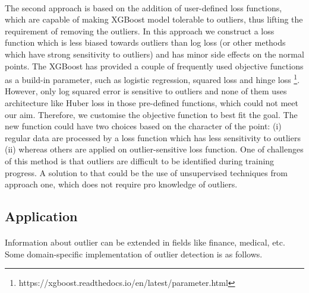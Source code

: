 \documentclass[runningheads]{llncs}
\begin{document}
\paragraph{} The second approach is based on the addition of user-defined loss functions, which are capable of making XGBoost model tolerable to outliers, thus lifting the requirement of removing the outliers. In this approach we construct a loss function which is less biased towards outliers than log loss (or other methods which have strong sensitivity to outliers) and has minor side effects on the normal points. The XGBoost has provided a couple of frequently used objective functions as a build-in parameter, such as logistic regression, squared loss and hinge loss \footnote{https://xgboost.readthedocs.io/en/latest/parameter.html}. However, only log squared error is sensitive to outliers and none of them uses architecture like Huber loss in those pre-defined functions, which could not meet our aim. Therefore, we customise the objective function to best fit the goal. The new function could have two choices based on the character of the point: (i) regular data are processed by a loss function which has less sensitivity to outliers (ii) whereas others are applied on outlier-sensitive loss function. One of challenges of this method is that outliers are difficult to be identified during training progress. A solution to that could be the use of unsupervised techniques from approach one, which does not require pro knowledge of outliers.



\subsection{Application}
\paragraph{} Information about outlier can be extended in fields like finance, medical, etc. Some domain-specific implementation of outlier detection is as follows.
\end{document}
